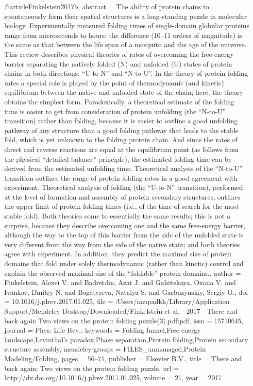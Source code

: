 @article{Finkelstein2017b,
abstract = {The ability of protein chains to spontaneously form their spatial structures is a long-standing puzzle in molecular biology. Experimentally measured folding times of single-domain globular proteins range from microseconds to hours: the difference (10–11 orders of magnitude) is the same as that between the life span of a mosquito and the age of the universe. This review describes physical theories of rates of overcoming the free-energy barrier separating the natively folded (N) and unfolded (U) states of protein chains in both directions: “U-to-N” and “N-to-U”. In the theory of protein folding rates a special role is played by the point of thermodynamic (and kinetic) equilibrium between the native and unfolded state of the chain; here, the theory obtains the simplest form. Paradoxically, a theoretical estimate of the folding time is easier to get from consideration of protein unfolding (the “N-to-U” transition) rather than folding, because it is easier to outline a good unfolding pathway of any structure than a good folding pathway that leads to the stable fold, which is yet unknown to the folding protein chain. And since the rates of direct and reverse reactions are equal at the equilibrium point (as follows from the physical “detailed balance” principle), the estimated folding time can be derived from the estimated unfolding time. Theoretical analysis of the “N-to-U” transition outlines the range of protein folding rates in a good agreement with experiment. Theoretical analysis of folding (the “U-to-N” transition), performed at the level of formation and assembly of protein secondary structures, outlines the upper limit of protein folding times (i.e., of the time of search for the most stable fold). Both theories come to essentially the same results; this is not a surprise, because they describe overcoming one and the same free-energy barrier, although the way to the top of this barrier from the side of the unfolded state is very different from the way from the side of the native state; and both theories agree with experiment. In addition, they predict the maximal size of protein domains that fold under solely thermodynamic (rather than kinetic) control and explain the observed maximal size of the “foldable” protein domains.},
author = {Finkelstein, Alexei V. and Badretdin, Azat J. and Galzitskaya, Oxana V. and Ivankov, Dmitry N. and Bogatyreva, Natalya S. and Garbuzynskiy, Sergiy O.},
doi = {10.1016/j.plrev.2017.01.025},
file = {:Users/anupadkh/Library/Application Support/Mendeley Desktop/Downloaded/Finkelstein et al. - 2017 - There and back again Two views on the protein folding puzzle(3).pdf:pdf},
issn = {15710645},
journal = {Phys. Life Rev.},
keywords = {Folding funnel,Free-energy landscape,Levinthal's paradox,Phase separation,Protein folding,Protein secondary structure assembly},
mendeley-groups = {FILES{\_}unmanaged,Protein Modeling/Folding},
pages = {56--71},
publisher = {Elsevier B.V.},
title = {{There and back again: Two views on the protein folding puzzle}},
url = {http://dx.doi.org/10.1016/j.plrev.2017.01.025},
volume = {21},
year = {2017}
}

